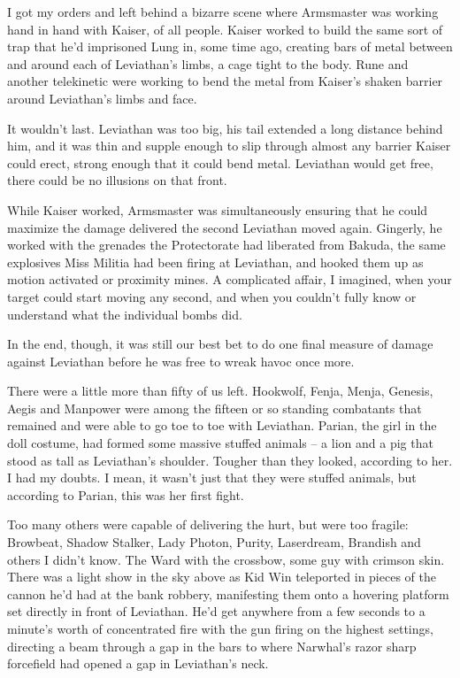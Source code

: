 





I got my orders and left behind a bizarre scene where Armsmaster was working hand in hand with Kaiser, of all people.  Kaiser worked to build the same sort of trap that he'd imprisoned Lung in, some time ago, creating bars of metal between and around each of Leviathan's limbs, a cage tight to the body.  Rune and another telekinetic were working to bend the metal from Kaiser's shaken barrier around Leviathan's limbs and face.



It wouldn't last.  Leviathan was too big, his tail extended a long distance behind him, and it was thin and supple enough to slip through almost any barrier Kaiser could erect, strong enough that it could bend metal.  Leviathan would get free, there could be no illusions on that front.



While Kaiser worked, Armsmaster was simultaneously ensuring that he could maximize the damage delivered the second Leviathan moved again.  Gingerly, he worked with the grenades the Protectorate had liberated from Bakuda, the same explosives Miss Militia had been firing at Leviathan, and hooked them up as motion activated or proximity mines.  A complicated affair, I imagined, when your target could start moving any second, and when you couldn't fully know or understand what the individual bombs did.



In the end, though, it was still our best bet to do one final measure of damage against Leviathan before he was free to wreak havoc once more.



There were a little more than fifty of us left.  Hookwolf, Fenja, Menja, Genesis, Aegis and Manpower were among the fifteen or so standing combatants that remained and were able to go toe to toe with Leviathan.  Parian, the girl in the doll costume, had formed some massive stuffed animals – a lion and a pig that stood as tall as Leviathan's shoulder.  Tougher than they looked, according to her.  I had my doubts.  I mean, it wasn't just that they were stuffed animals, but according to Parian, this was her first fight.



Too many others were capable of delivering the hurt, but were too fragile: Browbeat, Shadow Stalker, Lady Photon, Purity, Laserdream, Brandish and others I didn't know.  The Ward with the crossbow, some guy with crimson skin.  There was a light show in the sky above as Kid Win teleported in pieces of the cannon he'd had at the bank robbery, manifesting them onto a hovering platform set directly in front of Leviathan.  He'd get anywhere from a few seconds to a minute's worth of concentrated fire with the gun firing on the highest settings, directing a beam through a gap in the bars to where Narwhal's razor sharp forcefield had opened a gap in Leviathan's neck.



